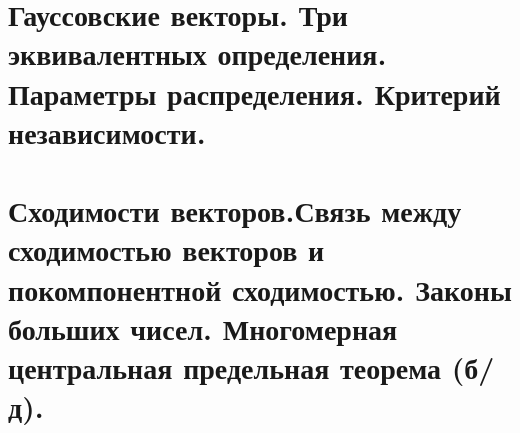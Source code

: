 \section{Гауссовские векторы. Три эквивалентных определения. Параметры распределения. Критерий независимости.}


\section{Сходимости векторов.Связь между сходимостью векторов и покомпонентной сходимостью. Законы больших чисел. Многомерная центральная предельная теорема (б/д).}


